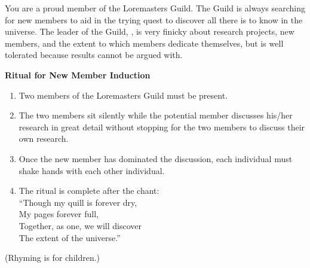 \documentclass[green]{guildcamp2}
\begin{document}
\name{\gnewmemberlore{}}

You are a proud member of the Loremasters Guild. The Guild is always searching for new members to aid in the trying quest to discover all there is to know in the universe. The leader of the Guild, \cVampire{}, is very finicky about research projects, new members, and the extent to which members dedicate themselves, but \cVampire{\they} is well tolerated because \cVampire{\their} results cannot be argued with. 

{\bf Ritual for New Member Induction}
\begin{enumerate}
\item Two members of the Loremasters Guild must be present.
\item The two members sit silently while the potential member discusses his/her research in great detail without stopping for the two members to discuss their own research.
\item Once the new member has dominated the discussion, each individual must shake hands with each other individual.
\item The ritual is complete after the chant:\\ ``Though my quill is forever dry,\\My pages forever full,\\Together, as one, we will discover\\The extent of the universe.''
\end{enumerate}

(Rhyming is for children.)
\end{document}

